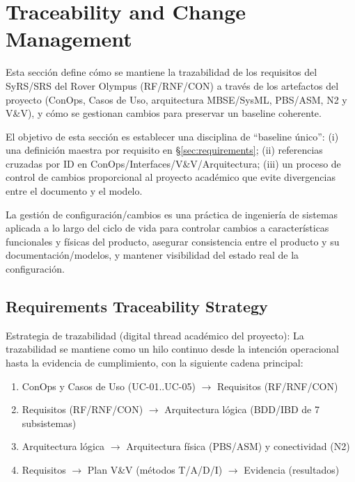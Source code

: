 
\section{Traceability and Change Management}\label{sec:traceability}

Esta sección define cómo se mantiene la trazabilidad de los requisitos del SyRS/SRS del Rover Olympus (RF/RNF/CON) a través de los artefactos del proyecto (ConOps, Casos de Uso, arquitectura MBSE/SysML, PBS/ASM, N2 y V\&V), y cómo se gestionan cambios para preservar un baseline coherente.

El objetivo de esta sección es establecer una disciplina de ``baseline único'': (i) una definición maestra por requisito en \S\ref{sec:requirements}; (ii) referencias cruzadas por ID en ConOps/Interfaces/V\&V/Arquitectura; (iii) un proceso de control de cambios proporcional al proyecto académico que evite divergencias entre el documento y el modelo.

La gestión de configuración/cambios es una práctica de ingeniería de sistemas aplicada a lo largo del ciclo de vida para controlar cambios a características funcionales y físicas del producto, asegurar consistencia entre el producto y su documentación/modelos, y mantener visibilidad del estado real de la configuración.

\subsection{Requirements Traceability Strategy}\label{subsec:req-traceability}

Estrategia de trazabilidad (digital thread académico del proyecto): La trazabilidad se mantiene como un hilo continuo desde la intención operacional hasta la evidencia de cumplimiento, con la siguiente cadena principal:
\begin{enumerate}
  \item ConOps y Casos de Uso (UC-01..UC-05) $\rightarrow$ Requisitos (RF/RNF/CON)
  \item Requisitos (RF/RNF/CON) $\rightarrow$ Arquitectura lógica (BDD/IBD de 7 subsistemas)
  \item Arquitectura lógica $\rightarrow$ Arquitectura física (PBS/ASM) y conectividad (N2)
  \item Requisitos $\rightarrow$ Plan V\&V (métodos T/A/D/I) $\rightarrow$ Evidencia (resultados)
\end{enumerate}

